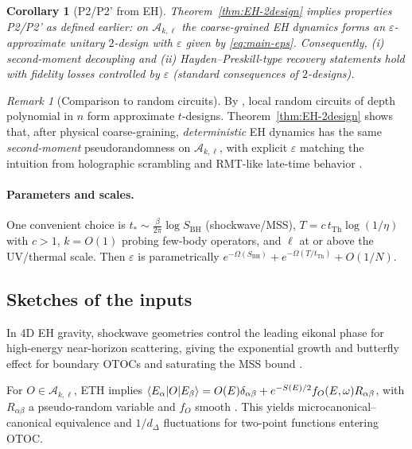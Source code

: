 \documentclass[a4paper,11pt]{article}
\theoremstyle{plain}
\newtheorem{corollary}{Corollary}
\theoremstyle{definition}
\theoremstyle{remark}
\newtheorem{remark}{Remark}
\begin{document}
\begin{corollary}[P2/P2' from EH]\label{cor:P2P2prime}
Theorem~\ref{thm:EH-2design} implies properties P2/P2' as defined earlier: on $\mathscr{A}_{k,\ell}$ the coarse-grained EH dynamics forms an $\varepsilon$-approximate unitary $2$-design with $\varepsilon$ given by \eqref{eq:main-eps}.  Consequently, (i) second-moment decoupling and (ii) Hayden--Preskill-type recovery statements hold with fidelity losses controlled by $\varepsilon$ (standard consequences of $2$-designs).
\end{corollary}

\begin{remark}[Comparison to random circuits]
By \cite{BrandaoHarrowHorodecki2016}, local random circuits of depth polynomial in $n$ form approximate $t$-designs.  Theorem~\ref{thm:EH-2design} shows that, after physical coarse-graining, {\em deterministic} EH dynamics has the same {\em second-moment} pseudorandomness on $\mathscr{A}_{k,\ell}$, with explicit $\varepsilon$ matching the intuition from holographic scrambling and RMT-like late-time behavior \cite{SaadShenkerStanford2019,CotlerEtAl2017}.
\end{remark}

\paragraph{Parameters and scales.}  One convenient choice is $t_\ast\sim \frac{\beta}{2\pi}\log S_{\mathrm{BH}}$ (shockwave/MSS), $T=c\, t_{\mathrm{Th}} \log(1/\eta)$ with $c>1$, $k=O(1)$ probing few-body operators, and $\ell$ at or above the UV/thermal scale.  Then $\varepsilon$ is parametrically $e^{-\Omega(S_{\mathrm{BH}})} + e^{-\Omega(T/t_{\mathrm{Th}})} + O(1/N)$.

\subsection*{Sketches of the inputs}
 In 4D EH gravity, shockwave geometries control the leading eikonal phase for high-energy near-horizon scattering, giving the exponential growth and butterfly effect for boundary OTOCs and saturating the MSS bound \cite{MaldacenaShenkerStanford2016,ShenkerStanford2014}.

 For $O\in\mathscr{A}_{k,\ell}$, ETH implies
$\left\langle E_\alpha \middle| O \middle| E_\beta\right\rangle = O(E)\delta_{\alpha\beta} + e^{-S(E)/2} f_O(E,\omega) R_{\alpha\beta}$, with $R_{\alpha\beta}$ a pseudo-random variable and $f_O$ smooth \cite{DAlessioKafriPolkovnikovRigol2016}.  This yields microcanonical--canonical equivalence and $1/d_\Delta$ fluctuations for two-point functions entering $\mathrm{OTOC}$.
\end{document}
